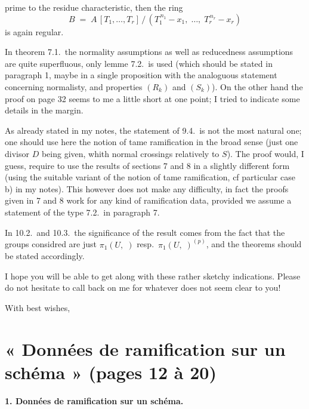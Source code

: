 \documentclass[11pt,a4paper]{article}
\begin{document}
prime to the residue characteristic, then the ring
\[
  B \;=\; A\,[T_1,\dots,T_r]\,/\,(T_1^{\,n_1}-x_1,\;\dots,\;T_r^{\,n_r}-x_r)
\]
is again regular.

In theorem 7.1.\ the normality assumptions as well as reducedness assumptions
are quite superfluous, only lemme 7.2.\ is used (which should be stated in
paragraph 1, maybe in a single proposition with the analoguous statement
concerning normalisty, and properties $(R_k)$ and $(S_k)$). On the other hand
the proof on page 32 seems to me a little short at one point; I tried to
indicate some details in the margin.

As already stated in my notes, the statement of 9.4.\ is not the most natural
one; one should use here the notion of tame ramification in the broad sense
(just one divisor $D$ being given, whith normal crossings relatively to $S$).
 The proof would, I guess, require to use the results of
sections 7 and 8 in a slightly different form (using the suitable variant of
the notion of tame ramification, cf  particular case b) in my
notes). This however does not make any difficulty, in fact the proofs given in
7 and 8 work for any kind of ramification data, provided we assume a statement
of the type 7.2.\ in paragraph 7.

In 10.2.\ and 10.3.\ the significance of the result comes from the fact that
the groups considred are just $\pi_1(U,\;)$ resp.\ $\pi_1(U,\;)^{(p)}$, and the
theorems should be stated accordingly.

I hope you will be able to get along with these rather sketchy indications.
Please do not hesitate to call back on me for whatever does not seem clear to
you!

With best wishes,

\section*{« Données de ramification sur un schéma » (pages 12 à 20)}

\textbf{1. Données de ramification sur un schéma.}
\end{document}

